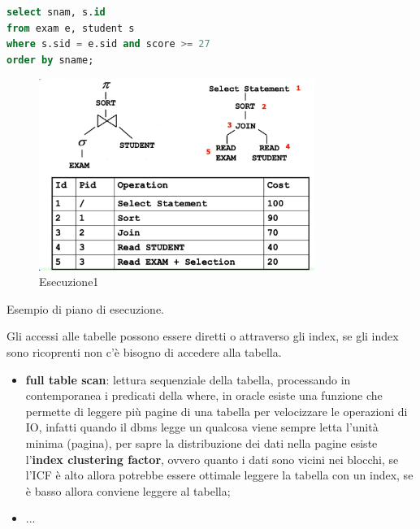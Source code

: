 \documentclass[12pt]{article}
\begin{document}
\begin{lstlisting}[language=sql]
select snam, s.id
from exam e, student s
where s.sid = e.sid and score >= 27
order by sname;
\end{lstlisting}
\begin{figure}[H]
    \centering
    \includegraphics[width=0.8\textwidth]{esecuzione1.png}
    \caption{Esecuzione1}
    \label{fig:esecuzione1}
\end{figure}
Esempio di piano di esecuzione.


Gli accessi alle tabelle possono essere diretti o attraverso gli index, se gli index sono ricoprenti non c'\`e bisogno di accedere alla tabella.
\begin{itemize}
    \item \textbf{full table scan}: lettura sequenziale della tabella, processando in contemporanea i predicati della where, in oracle esiste una funzione che permette di leggere pi\`u pagine di una tabella per velocizzare le operazioni di IO, infatti quando il dbms legge un qualcosa viene sempre letta l'unit\`a minima (pagina), per sapre la distribuzione dei dati nella pagine esiste l'\textbf{index clustering factor}, ovvero quanto i dati sono vicini nei blocchi, se l'ICF \`e alto allora potrebbe essere ottimale leggere la tabella con un index, se \`e basso allora conviene leggere al tabella;
    \item ...
\end{itemize}
\end{document}
